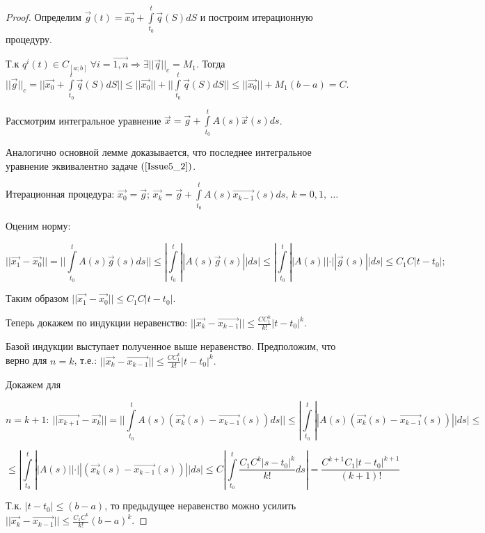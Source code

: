 \begin{proof}

Определим $\vec{g}(t) = \vec{x_0} + \int\limits_{t_0}^{t} \vec{q}(S)dS$ и построим итерационную процедуру.

Т.к $q^i(t) \in C_{[a;b]}\ \forall i = \vec{1,n} \Rightarrow \exists ||\vec{q}||_c = M_1.$ Тогда $||\vec{g}||_c = ||\vec{x_0} + \int\limits_{t_0}^{t}\vec{q}(S)dS|| \leqslant ||\vec{x_0}|| + ||\int\limits_{t_0}^{t}\vec{q}(S)dS|| \leqslant ||\vec{x_0}|| + M_1(b-a) = C.$

Рассмотрим интегральное уравнение $\vec{x} = \vec{g} + \int\limits_{t_0}^{t}A(s)\vec{x}(s)ds$.

Аналогично основной лемме доказывается, что последнее интегральное уравнение эквивалентно задаче $(\ref{Issue5_2})$.

Итерационная процедура: $\vec{x_0} = \vec{g}$; $\vec{x_k} = \vec{g} + \int\limits_{t_0}^{t} A(s)\vec{x_{k-1}}(s)ds $, $k = 0,1,\ \dots$

Оценим норму:

$$ ||\vec{x_1} - \vec{x_0}|| = || \int\limits_{t_0}^{t} A(s)\vec{g}(s)ds || \leqslant | \int\limits_{t_0}^{t} ||A(s)\vec{g}(s)||ds | \leqslant  | \int\limits_{t_0}^{t} ||A(s)||\cdot ||\vec{g}(s)||ds | \leqslant C_1 C |t - t_0|;$$ 

Таким образом $||\vec{x_1} -\vec{x_0}|| \leqslant C_1C|t-t_0|.$

Теперь докажем по индукции неравенство: $||\vec{x_k} - \vec{x_{k-1}}|| \leqslant \frac{CC_1^k}{k!}|t-t_0|^k.$

Базой индукции выступает полученное выше неравенство. Предположим, что верно для $n = k$, т.е.: $||\vec{x_k} - \vec{x_{k-1}}|| \leqslant \frac{CC_1^k}{k!}|t-t_0|^k.$

Докажем для 

\[n = k + 1:\  ||\vec{x_{k+1}} - \vec{x_{k}}|| = || \int\limits_{t_0}^{t} A(s)(\vec{x_k}(s) - \vec{x_{k-1}}(s))ds || \leqslant | \int\limits_{t_0}^{t} ||A(s)(\vec{x_k}(s) - \vec{x_{k-1}}(s))|| ds | \leqslant \]

\[ \leqslant | \int\limits_{t_0}^{t} ||A(s)||\cdot ||(\vec{x_k}(s) - \vec{x_{k-1}}(s))|| ds | \leqslant C |\int\limits_{t_0}^{t} \frac{C_1C^k|s-t_0|^k}{k!}ds | = \frac{C^{k+1}C_1|t-t_0|^{k+1}}{(k+1)!} \]

Т.к. $|t-t_0| \leqslant (b-a)$, то предыдущее неравенство можно усилить $||\vec{x_k} - \vec{x_{k-1}}|| \leqslant \frac{C_1C^k}{k!}(b-a)^k.$



\end{proof}




















 
